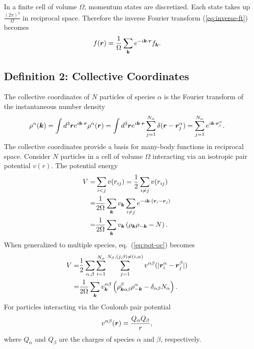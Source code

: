 In a finite cell of volume $\Omega$, momentum states are discretized. Each state takes up $\frac{(2\pi)^3}{\Omega}$ in reciprocal space. Therefore the inverse Fourier transform (\ref{eq:inverse-ft}) becomes
\begin{align}
f(\boldsymbol{r}) = \frac{1}{\Omega} \sum\limits_{\boldsymbol{k}} e^{-i\boldsymbol{k}\cdot\boldsymbol{r}} f_{\boldsymbol{k}}.
\end{align}

\subsection{Definition 2: Collective Coordinates}
The collective coordinates of $N$ particles of species $\alpha$ is the Fourier transform of the instantaneous number density
\begin{align}
\rho^\alpha(\boldsymbol{k}) = \int d^3\boldsymbol{r} e^{i\boldsymbol{k}\cdot\boldsymbol{r}} \rho^\alpha(\boldsymbol{r})
= \int d^3\boldsymbol{r} e^{i\boldsymbol{k}\cdot\boldsymbol{r}} \sum\limits_{j=1}^{N_\alpha} \delta(\boldsymbol{r}-\boldsymbol{r}^\alpha_j)=\sum\limits_{j=1}^{N_\alpha} e^{i\boldsymbol{k}\cdot\boldsymbol{r}_j^\alpha}. \label{eq:rhok}
\end{align}
The collective coordinates provide a basis for many-body functions in reciprocal space. Consider $N$ particles in a cell of volume $\Omega$ interacting via an isotropic pair potential $v(r)$. The potential energy
\begin{align}
V =& \sum\limits_{i<j} v(r_{ij}) = \frac{1}{2} \sum\limits_{i\neq j} v(r_{ij}) \nonumber \\
=& \frac{1}{2\Omega} \sum\limits_{\boldsymbol{k}}v_{\boldsymbol{k}} \sum\limits_{i\neq j}   e^{-i\boldsymbol{k}\cdot(\boldsymbol{r}_i-\boldsymbol{r}_j)} \nonumber \\
=& \frac{1}{2\Omega} \sum\limits_{\boldsymbol{k}}v_{\boldsymbol{k}} \left( \rho_{\boldsymbol{k}}\rho_{-\boldsymbol{k}}-N \right). \label{eq:pot-oc}
\end{align}
When generalized to multiple species, eq.~(\ref{eq:pot-oc}) becomes
\begin{align}
V =& \frac{1}{2}\sum\limits_{\alpha, \beta} \sum\limits_{i=1}^{N_\alpha} \sum\limits_{j=1}^{N_\beta, (j,\beta)\neq(i,\alpha)} v^{\alpha\beta}(\vert\boldsymbol{r}_i^\alpha - \boldsymbol{r}_j^\beta \vert) \nonumber \\
=& \frac{1}{2\Omega} \sum\limits_{\boldsymbol{k}}
v^{\alpha\beta}_{\boldsymbol{k}} \left( \rho^\beta_{\boldsymbol{k}\alpha\beta}\rho^\alpha_{-\boldsymbol{k}}-\delta_{\alpha\beta}N_\alpha \right). \label{eq:pot-mc}
\end{align}
For particles interacting via the Coulomb pair potential
\begin{align}
v^{\alpha\beta}(\boldsymbol{r}) = \frac{Q_\alpha Q_\beta}{r},
\end{align}
where $Q_\alpha$ and $Q_\beta$ are the charges of species $\alpha$ and $\beta$, respectively.

